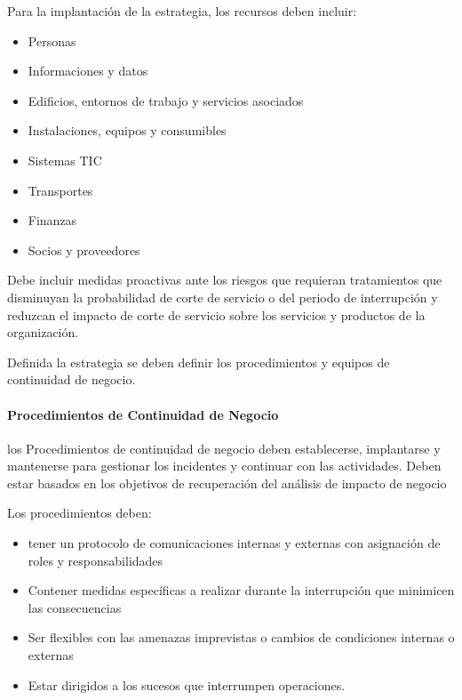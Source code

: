             Para la implantación de la estrategia, los recursos deben incluir:
            \begin{itemize}
                \item Personas
                \item Informaciones y datos
                \item Edificios, entornos de trabajo y servicios asociados
                \item Instalaciones, equipos y consumibles
                \item Sistemas TIC
                \item Transportes
                \item Finanzas
                \item Socios y proveedores
            \end{itemize}

            Debe incluir medidas proactivas ante los riesgos que requieran tratamientos que disminuyan la probabilidad de corte de servicio o del periodo de interrupción y reduzcan el impacto de corte de servicio sobre los servicios y productos de la organización.

            Definida la estrategia se deben definir los procedimientos y equipos de continuidad de negocio.

        \paragraph{Procedimientos de Continuidad de Negocio}
            los Procedimientos de continuidad de negocio deben establecerse, implantarse y mantenerse para gestionar los incidentes y continuar con las actividades. Deben estar basados en los objetivos de recuperación del análisis de impacto de negocio

            Los procedimientos deben:
            \begin{itemize}
                \item tener un protocolo de comunicaciones internas y externas con asignación de roles y responsabilidades
                \item Contener medidas específicas a realizar durante la interrupción que minimicen las consecuencias
                \item Ser flexibles con las amenazas imprevistas o cambios de condiciones internas o externas
                \item Estar dirigidos a los sucesos que interrumpen operaciones.
            \end{itemize}

